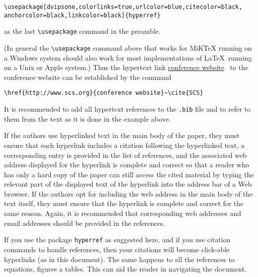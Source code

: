 \documentclass{scspaperproc}
\theoremstyle{scsthe}
\begin{document}
\begin{verbatim}
\usepackage[dvipsone,colorlinks=true,urlcolor=blue,citecolor=black,
anchorcolor=black,linkcolor=black]{hyperref}
\end{verbatim}

as the last \verb+\usepackage+ command in the preamble.

(In general the \verb+\usepackage+ command above that works for MiKTeX running on a Windows system should also work for most implementations of \LaTeX\ running on a Unix or Apple system.)
Thus the hypertext link \href{http://www.scs.org}{conference website}~\cite{SCS} to the conference website can be established by the command

\begin{verbatim}
\href{http://www.scs.org}{conference website}~\cite{SCS}
\end{verbatim}

It is recommended to add all hypertext references to the \texttt{.bib} file and to refer to them from the text as it is done in the example above.

If the authors use hyperlinked text in the main body of the paper, they must ensure that each hyperlink includes a citation following the hyperlinked text, a corresponding entry is provided in the list of references, and the associated web address displayed for the hyperlink is complete and correct so that a reader who has only a hard copy of the paper can still access the cited material by typing the relevant part of the displayed text of the hyperlink into the address bar of a Web browser. If the authors opt for including the web address in the main body of the text itself, they must ensure that the hyperlink is complete and correct for the same reason. Again, it is recommended that corresponding web addresses and email addresses should be provided in the references.

If you use the package \texttt{hyperref} as suggested here, and if you use citation commands to handle references, then your citations will
become click-able hyperlinks (as in this document). The same happens to all the references to equations, figures a tables. This can aid the reader in navigating the document.
\end{document}
